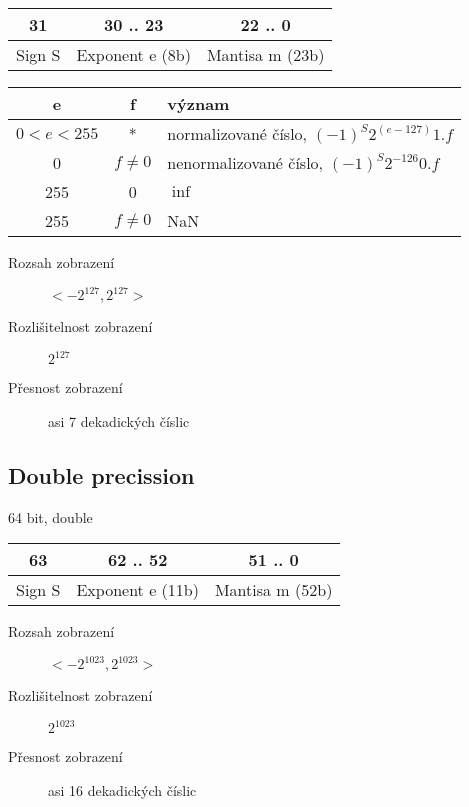\documentclass[a4paper, 11pt]{report}
\begin{document}
\begin{tabular}{| c | c | c |}
	\hline
	31 & 30 .. 23 & 22 .. 0 \\ \hline
	Sign S  & Exponent e (8b) & Mantisa m (23b) \\ \hline
\end{tabular}

\begin{tabular}{| c | c | l |}
	\hline
	e & f & význam \\ \hline
	$0<e<255$ & * & normalizované číslo, $(-1)^S 2^{(e-127)} 1.f$  \\ \hline
	0 & $f \neq 0$ & nenormalizované číslo, $(-1)^S 2^{-126} 0.f$  \\ \hline
	255 & 0 & $\inf$ \\ \hline
	255 & $f \neq 0$ & NaN \\ \hline
\end{tabular}

\begin{description}
	\item[Rozsah zobrazení] $< -2^{127}, 2^{127} >$
	\item[Rozlišitelnost zobrazení] $2^127$
	\item[Přesnost zobrazení] asi 7 dekadických číslic
\end{description}

\subsection{Double precission}
64 bit, double

\begin{tabular}{| c | c | c |}
	\hline
	63 & 62 .. 52 & 51 .. 0 \\ \hline
	Sign S  & Exponent e (11b) & Mantisa m (52b) \\ \hline
\end{tabular}

\begin{description}
	\item[Rozsah zobrazení] $< -2^{1023}, 2^{1023} >$
	\item[Rozlišitelnost zobrazení] $2^1023$
	\item[Přesnost zobrazení] asi 16 dekadických číslic
\end{description}
\end{document}
